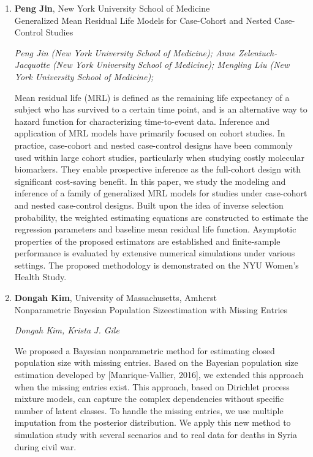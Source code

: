 \begin{enumerate}
\item \textbf{Peng Jin}, New York University School of Medicine \\
Generalized Mean Residual Life Models for Case-Cohort and Nested Case-Control Studies

\emph{\footnotesize Peng Jin (New York University School of Medicine); Anne Zeleniuch-Jacquotte (New York University School of Medicine); Mengling Liu (New York University School of Medicine);}

Mean residual life (MRL) is defined as the remaining life expectancy of a subject who has survived to a certain time point, and is an alternative way to hazard function for characterizing time-to-event data. Inference and application of MRL models have primarily focused on cohort studies. In practice, case-cohort and nested case-control designs have been commonly used within large cohort studies, particularly when studying costly molecular biomarkers. They enable prospective inference as the full-cohort design with significant cost-saving benefit. In this paper, we study the modeling and inference of a family of generalized MRL models for studies under case-cohort and nested case-control designs. Built upon the idea of inverse selection probability, the weighted estimating equations are constructed to estimate the regression parameters and baseline mean residual life function. Asymptotic properties of the proposed estimators are established and finite-sample performance is evaluated by extensive numerical simulations under various settings. The proposed methodology is demonstrated on the NYU Women's Health Study.

\item \textbf{Dongah Kim}, University of Massachusetts, Amherst \\
Nonparametric Bayesian Population Sizeestimation with Missing Entries

\emph{\footnotesize Dongah Kim, Krista J. Gile}

We proposed a Bayesian nonparametric method for estimating closed population size with missing entries. Based on the Bayesian population size estimation developed by [Manrique-Vallier, 2016], we extended this approach when the missing entries exist. This approach, based on Dirichlet process mixture models, can capture the complex dependencies without specific number of latent classes. To handle the missing entries, we use multiple imputation from the posterior distribution. We apply this new method to simulation study with several scenarios and to real data for deaths in Syria during civil war.


\end{enumerate}
